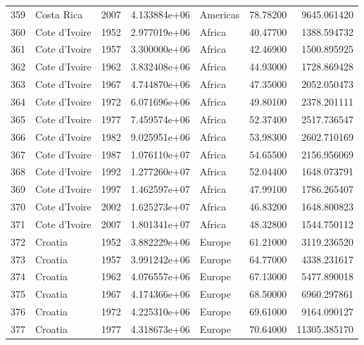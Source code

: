 \documentclass[
  letterpaper,
  DIV=11,
  numbers=noendperiod]{scrreprt}
\begin{document}
\begin{tabular}{llrrlrr}
359  &                Costa Rica &  2007 &  4.133884e+06 &  Americas &  78.78200 &    9645.061420 \\
360  &             Cote d'Ivoire &  1952 &  2.977019e+06 &    Africa &  40.47700 &    1388.594732 \\
361  &             Cote d'Ivoire &  1957 &  3.300000e+06 &    Africa &  42.46900 &    1500.895925 \\
362  &             Cote d'Ivoire &  1962 &  3.832408e+06 &    Africa &  44.93000 &    1728.869428 \\
363  &             Cote d'Ivoire &  1967 &  4.744870e+06 &    Africa &  47.35000 &    2052.050473 \\
364  &             Cote d'Ivoire &  1972 &  6.071696e+06 &    Africa &  49.80100 &    2378.201111 \\
365  &             Cote d'Ivoire &  1977 &  7.459574e+06 &    Africa &  52.37400 &    2517.736547 \\
366  &             Cote d'Ivoire &  1982 &  9.025951e+06 &    Africa &  53.98300 &    2602.710169 \\
367  &             Cote d'Ivoire &  1987 &  1.076110e+07 &    Africa &  54.65500 &    2156.956069 \\
368  &             Cote d'Ivoire &  1992 &  1.277260e+07 &    Africa &  52.04400 &    1648.073791 \\
369  &             Cote d'Ivoire &  1997 &  1.462597e+07 &    Africa &  47.99100 &    1786.265407 \\
370  &             Cote d'Ivoire &  2002 &  1.625273e+07 &    Africa &  46.83200 &    1648.800823 \\
371  &             Cote d'Ivoire &  2007 &  1.801341e+07 &    Africa &  48.32800 &    1544.750112 \\
372  &                   Croatia &  1952 &  3.882229e+06 &    Europe &  61.21000 &    3119.236520 \\
373  &                   Croatia &  1957 &  3.991242e+06 &    Europe &  64.77000 &    4338.231617 \\
374  &                   Croatia &  1962 &  4.076557e+06 &    Europe &  67.13000 &    5477.890018 \\
375  &                   Croatia &  1967 &  4.174366e+06 &    Europe &  68.50000 &    6960.297861 \\
376  &                   Croatia &  1972 &  4.225310e+06 &    Europe &  69.61000 &    9164.090127 \\
377  &                   Croatia &  1977 &  4.318673e+06 &    Europe &  70.64000 &   11305.385170 \\

\end{tabular}
\end{document}
